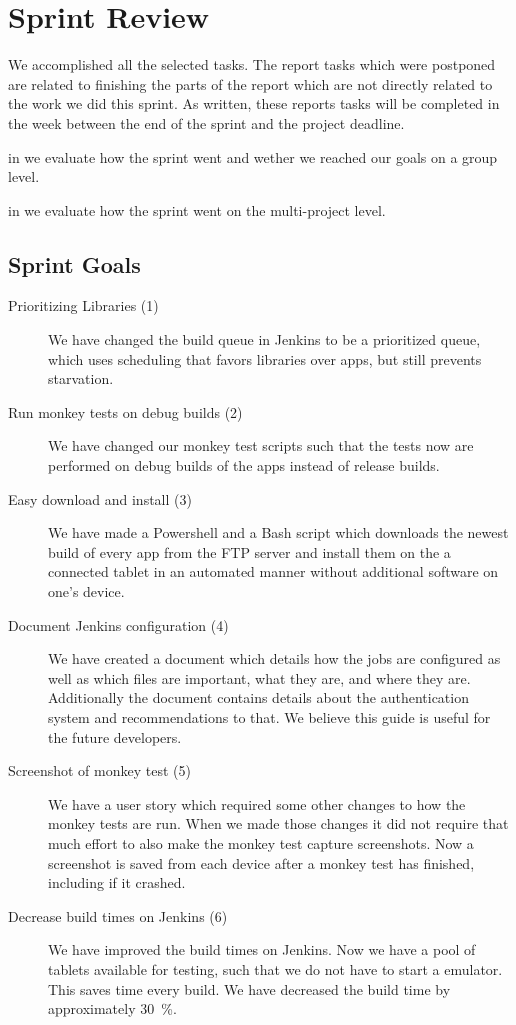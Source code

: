 \chapter{Sprint Review}\label{chap:sprint4_end}
 We accomplished all the selected tasks. The report tasks which were postponed are related to finishing the parts of the report which are not directly related to the work we did this sprint. As written, these reports tasks will be completed in the week between the end of the sprint and the project deadline.

\begin{chapterorganization}
    \item in  we evaluate how the sprint went and wether we reached our goals on a group level.
    \item in  we evaluate how the sprint went on the multi-project level.
\end{chapterorganization}

\section{Sprint Goals}\label{sec:s4_goals}
\begin{description}
    \item[Prioritizing Libraries (1)] We have changed the build queue in Jenkins to be a prioritized queue, which uses scheduling that favors libraries over apps, but still prevents starvation.
    \item[Run monkey tests on debug builds (2)] We have changed our monkey test scripts such that the tests now are performed on debug builds of the apps instead of release builds.
    \item[Easy download and install (3)] We have made a Powershell and a Bash script which downloads the newest build of every app from the FTP server and install them on the a connected tablet in an automated manner without additional software on one's device.
    \item[Document Jenkins configuration (4)] We have created a document which details how the jobs are configured as well as which files are important, what they are, and where they are. Additionally the document contains details about the authentication system and recommendations to that. We believe this guide is useful for the future developers.
    \item[Screenshot of monkey test (5)] We have a user story which required some other changes to how the monkey tests are run. When we made those changes it did not require that much effort to also make the monkey test capture screenshots. Now a screenshot is saved from each device after a monkey test has finished, including if it crashed.
    \item[Decrease build times on Jenkins (6)] We have improved the build times on Jenkins. Now we have a pool of tablets available for testing, such that we do not have to start a emulator. This saves time every build. We have decreased the build time by approximately \SI{30}{\percent}.
\end{description}
